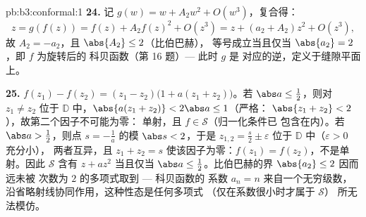 \begin{solution}{pb:b3:conformal:1}
\textbf{24.} 记 $g(w) = w + A_2w^2 + O(w^3)$，复合得：
\[
z = g(f(z)) = f(z) + A_2f(z)^2 + O(z^3)
= z + (a_2 + A_2)z^2 + O(z^3),
\]
故 $A_2 = -a_2$，且 $\abs{A_2} \leq 2$（比伯巴赫），
等号成立当且仅当 $\abs{a_2} = 2$，即 $f$ 为旋转后的
科贝函数（第 16 题）--- 此时 $g$ 是
对应的逆，定义于缝隙平面上。

\textbf{25.} $f(z_1) - f(z_2) = (z_1 - z_2)\bigl(1 + a(z_1 +
z_2)\bigr)$。若 $\abs a \leq \frac12$，则对 $z_1 \neq z_2$ 位于
$\mathbb D$ 中，$\abs{a(z_1 + z_2)} < 2\abs a \leq 1$（严格：
$\abs{z_1 + z_2} < 2$），故第二个因子不可能为零：
单射，且 $f \in \mathcal S$（归一化条件已
包含在内）。若 $\abs a > \frac12$，则点 $s =
-\frac1a$ 的模 $\abs s < 2$，于是 $z_{1,2} = \frac s2 \pm
\varepsilon$ 位于 $\mathbb D$ 中（$\varepsilon > 0$ 充分小），
两者互异，且 $z_1 + z_2 = s$ 使该因子为零：$f(z_1)
= f(z_2)$，不是单射。因此 $\mathcal S$ 含有 $z +
az^2$ 当且仅当 $\abs a \leq \frac12$。比伯巴赫的界
$\abs{a_2} \leq 2$ 因而远未被
次数为 $2$ 的多项式取到 --- 科贝函数的
系数 $a_n = n$ 来自一个无穷级数，
沿省略射线协同作用，这种性态是任何多项式
（仅在系数很小时才属于 $\mathcal S$）
所无法模仿。
\end{solution}
